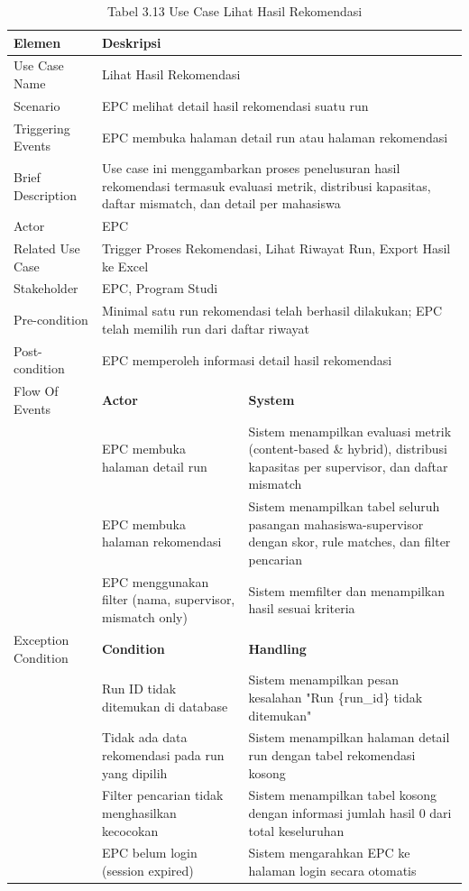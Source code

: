 \begin{longtable}{|p{3.5cm}|p{4.5cm}|p{5cm}|}
\caption{Tabel 3.13 Use Case Lihat Hasil Rekomendasi} \label{table:tab3.13} \\
\hline
\textbf{Elemen} & \multicolumn{2}{p{\ucdeskcol}|}{\textbf{Deskripsi}} \\
\hline
\endfirsthead
\endhead
\hline
\endfoot
Use Case Name & \multicolumn{2}{p{\ucdeskcol}|}{Lihat Hasil Rekomendasi} \\
\hline
Scenario & \multicolumn{2}{p{\ucdeskcol}|}{EPC melihat detail hasil rekomendasi suatu run} \\
\hline
Triggering Events & \multicolumn{2}{p{\ucdeskcol}|}{EPC membuka halaman detail run atau halaman rekomendasi} \\
\hline
Brief Description & \multicolumn{2}{p{\ucdeskcol}|}{Use case ini menggambarkan proses penelusuran hasil rekomendasi termasuk evaluasi metrik, distribusi kapasitas, daftar mismatch, dan detail per mahasiswa} \\
\hline
Actor & \multicolumn{2}{p{\ucdeskcol}|}{EPC} \\
\hline
Related Use Case & \multicolumn{2}{p{\ucdeskcol}|}{Trigger Proses Rekomendasi, Lihat Riwayat Run, Export Hasil ke Excel} \\
\hline
Stakeholder & \multicolumn{2}{p{\ucdeskcol}|}{EPC, Program Studi} \\
\hline
Pre-condition & \multicolumn{2}{p{\ucdeskcol}|}{Minimal satu run rekomendasi telah berhasil dilakukan; EPC telah memilih run dari daftar riwayat} \\
\hline
Post-condition & \multicolumn{2}{p{\ucdeskcol}|}{EPC memperoleh informasi detail hasil rekomendasi} \\
\hline
Flow Of Events & \textbf{Actor} & \textbf{System} \\
\hline
 & EPC membuka halaman detail run & Sistem menampilkan evaluasi metrik (content-based \& hybrid), distribusi kapasitas per supervisor, dan daftar mismatch \\
\hline
 & EPC membuka halaman rekomendasi & Sistem menampilkan tabel seluruh pasangan mahasiswa-supervisor dengan skor, rule matches, dan filter pencarian \\
\hline
 & EPC menggunakan filter (nama, supervisor, mismatch only) & Sistem memfilter dan menampilkan hasil sesuai kriteria \\
\hline
Exception Condition & \textbf{Condition} & \textbf{Handling} \\
\hline
 & Run ID tidak ditemukan di database & Sistem menampilkan pesan kesalahan "Run \{run\_id\} tidak ditemukan" \\
\hline
 & Tidak ada data rekomendasi pada run yang dipilih & Sistem menampilkan halaman detail run dengan tabel rekomendasi kosong \\
\hline
 & Filter pencarian tidak menghasilkan kecocokan & Sistem menampilkan tabel kosong dengan informasi jumlah hasil 0 dari total keseluruhan \\
\hline
 & EPC belum login (session expired) & Sistem mengarahkan EPC ke halaman login secara otomatis \\
\hline
\end{longtable}

